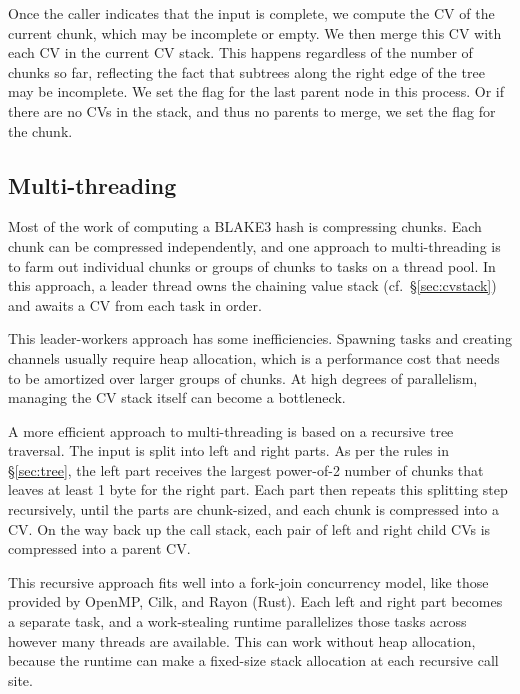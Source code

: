\documentclass[11pt,notitlepage,a4paper]{article}
\newcommand{\flag}[1]{\texttt{\detokenize{#1}}\xspace}
\begin{document}
Once the caller indicates that the input is complete, we compute the CV of the
current chunk, which may be incomplete or empty. We then merge this CV with
each CV in the current CV stack. This happens regardless of the number of
chunks so far, reflecting the fact that subtrees along the right edge of the
tree may be incomplete. We set the \flag{ROOT} flag for the last parent node in
this process. Or if there are no CVs in the stack, and thus no parents to
merge, we set the \flag{ROOT} flag for the chunk.

\subsection{Multi-threading}\label{sec:multithreading}

Most of the work of computing a BLAKE3 hash is compressing chunks. Each chunk
can be compressed independently, and one approach to multi-threading is to farm
out individual chunks or groups of chunks to tasks on a thread pool. In this
approach, a leader thread owns the chaining value stack
(cf.~\S\ref{sec:cvstack}) and awaits a CV from each task in order.

This leader-workers approach has some inefficiencies. Spawning tasks and
creating channels usually require heap allocation, which is a performance cost
that needs to be amortized over larger groups of chunks. At high degrees of
parallelism, managing the CV stack itself can become a bottleneck.

A more efficient approach to multi-threading is based on a recursive tree
traversal. The input is split into left and right parts. As per the rules in
\S\ref{sec:tree}, the left part receives the largest power-of-2 number of
chunks that leaves at least 1 byte for the right part. Each part then repeats
this splitting step recursively, until the parts are chunk-sized, and each
chunk is compressed into a CV. On the way back up the call stack, each pair of
left and right child CVs is compressed into a parent CV.

This recursive approach fits well into a fork-join concurrency model, like
those provided by OpenMP, Cilk, and Rayon (Rust). Each left and right part
becomes a separate task, and a work-stealing runtime parallelizes those tasks
across however many threads are available. This can work without heap
allocation, because the runtime can make a fixed-size stack allocation at each
recursive call site.
\end{document}
